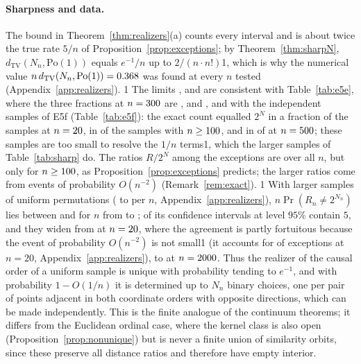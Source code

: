 \documentclass[11pt,a4paper]{article}
\providecommand{\HasRlaw}{0}
\providecommand{\HasRlawChk}{0}
\providecommand{\HasSharp}{0}
\theoremstyle{plain}
\theoremstyle{definition}
\theoremstyle{remark}
\begin{document}
\paragraph{Sharpness and data.}
The bound in Theorem~\ref{thm:realizers}(a) counts every interval and is about twice the true rate $5/n$ of Proposition~\ref{prop:exceptions}; by Theorem~\ref{thm:sharpN}, $d_{\mathrm{TV}}(N_n,\mathrm{Po}(1))$ equals $e^{-1}/n$ up to $2/(n\cdot n!)$\if\HasRlawChk1, which is why the numerical value $n\,d_{\mathrm{TV}}(N_n,\mathrm{Po}(1))=0.368$ was found at every $n$ tested (Appendix~\ref{app:realizers})\fi. \if\HasRlaw1 The limits \RlawPoissonOne, \RlawPoissonOne{} and \RlawPoissonLeThree{} are consistent with Table~\ref{tab:e5e}, where the three fractions at $n=300$ are \EfiveEuniqueNmax, \EfiveEtwoNmax{} and \EfiveEleEightNmax, and with the independent samples of E5f (Table~\ref{tab:e5f}): the exact count equalled $2^N$ in a fraction \RlawEqualFracNmin{} of the samples at $n=20$, in \RlawEqualBig{} of the \RlawSamplesBig{} samples with $n\ge100$, and in \RlawEqualNmax{} of \RlawSamplesNmax{} at $n=500$; these samples are too small to resolve the $1/n$ terms\if\HasSharp1, which the larger samples of Table~\ref{tab:sharp} do\fi. The ratios $R/2^N$ among the exceptions are \RlawRatiosAll{} over all $n$, but only \RlawRatiosBig{} for $n\ge100$, as Proposition~\ref{prop:exceptions} predicts; the larger ratios come from events of probability $O(n^{-2})$ (Remark~\ref{rem:exact}). \fi\if\HasRlawChk1 With larger samples of uniform permutations (\RlawChkSamplesMin{} to \RlawChkSamplesMax{} per $n$, Appendix~\ref{app:realizers}), $n\Pr(R_n\ne2^{N_n})$ lies between \RlawChkNPlo{} and \RlawChkNPhi{} for $n$ from \RlawChkNlo{} to \RlawChkNhi; \RlawChkCIcontainFive{} of its \RlawChkCIrows{} confidence intervals at level $95\%$ contain $5$, and they widen from \RlawChkCIfirst{} at $n=20$, where the agreement is partly fortuitous because the event of probability $O(n^{-2})$ is not small\if\HasSharp1{} (it accounts for \SharpFTwentyExcBad{} of \SharpFTwentyExc{} exceptions at $n=20$, Appendix~\ref{app:realizers})\fi, to \RlawChkCIlast{} at $n=2000$. \fi Thus the realizer of the causal order of a uniform sample is unique with probability tending to $e^{-1}$, and with probability $1-O(1/n)$ it is determined up to $N_n$ binary choices, one per pair of points adjacent in both coordinate orders with opposite directions, which can be made independently. This is the finite analogue of the continuum theorems; it differs from the Euclidean ordinal case, where the kernel class is also open (Proposition~\ref{prop:nonunique}) but is never a finite union of similarity orbits, since these preserve all distance ratios and therefore have empty interior.
\end{document}
